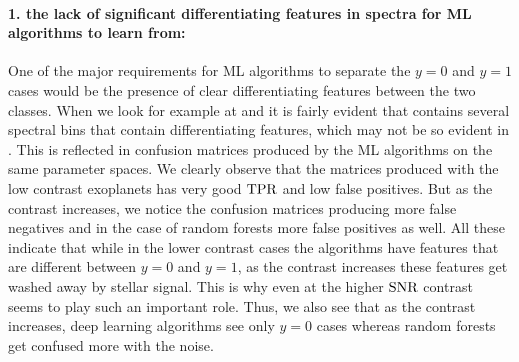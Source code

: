 \paragraph{1. the lack of significant differentiating features in spectra for ML algorithms to learn from:\\}
One of the major requirements for ML algorithms to separate the $y=0$ and $y=1$ cases would be the presence of clear differentiating features between the two classes.
When we look for example at  and  it is fairly evident that  contains several spectral bins that contain differentiating features, which may not be so evident in .
This is reflected in confusion matrices produced by the ML algorithms on the same parameter spaces.
We clearly observe that the matrices produced with the low contrast exoplanets has very good $\rm{TPR}$ and low false positives.
But as the contrast increases, we notice the confusion matrices producing more false negatives and in the case of random forests more false positives as well.
All these indicate that while in the lower contrast cases the algorithms have features that are different between $y=0$ and $y=1$, as the contrast increases these features get washed away by stellar signal.
This is why even at the higher $\rm{SNR}$ contrast seems to play such an important role.
Thus, we also see that as the contrast increases, deep learning algorithms see only $y=0$ cases whereas random forests get confused more with the noise.

